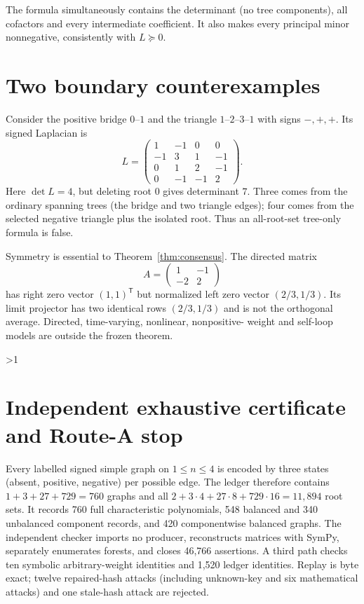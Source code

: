 \documentclass[9pt]{extarticle}
\begin{document}
The formula simultaneously contains the determinant (no tree components),
all cofactors and every intermediate coefficient.  It also makes every
principal minor nonnegative, consistently with $L\succeq0$.

\section{Two boundary counterexamples}
Consider the positive bridge $0$--$1$ and the triangle $1$--$2$--$3$--$1$
with signs $-,+,+$.  Its signed Laplacian is
\[
 L=\begin{pmatrix}1&-1&0&0\\-1&3&1&-1\\0&1&2&-1\\0&-1&-1&2\end{pmatrix}.
\]
Here $\det L=4$, but deleting root $0$ gives determinant $7$.  Three comes
from the ordinary spanning trees (the bridge and two triangle edges); four
comes from the selected negative triangle plus the isolated root.  Thus an
all-root-set tree-only formula is false.

Symmetry is essential to Theorem~\ref{thm:consensus}.  The directed matrix
\[
 A=\begin{pmatrix}1&-1\\-2&2\end{pmatrix}
\]
has right zero vector $(1,1)^{\mathsf T}$ but normalized left zero vector
$(2/3,1/3)$.  Its limit projector has two identical rows $(2/3,1/3)$ and is
not the orthogonal average.  Directed, time-varying, nonlinear, nonpositive-
weight and self-loop models are outside the frozen theorem.
\fi

\ifnum\CRevisionRound>1
\section{Independent exhaustive certificate and Route-A stop}
Every labelled signed simple graph on $1\le n\le4$ is encoded by three states
(absent, positive, negative) per possible edge.  The ledger therefore contains
$1+3+27+729=760$ graphs and all
$2+3\cdot4+27\cdot8+729\cdot16=11{,}894$ root sets.  It records 760 full
characteristic polynomials, 548 balanced and 340 unbalanced component records,
and 420 componentwise balanced graphs.  The independent checker imports no
producer, reconstructs matrices with SymPy, separately enumerates forests, and
closes 46,766 assertions.  A third path checks ten symbolic arbitrary-weight
identities and 1,520 ledger identities.  Replay is byte exact; twelve
repaired-hash attacks (including unknown-key and six mathematical attacks) and
one stale-hash attack are rejected.
\end{document}
